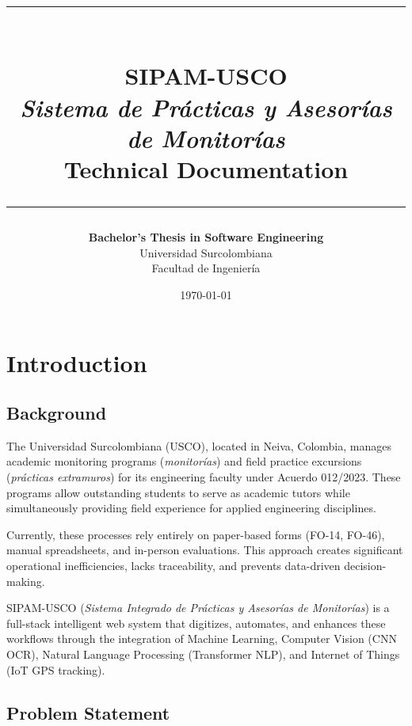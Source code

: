 \documentclass[12pt,a4paper]{report}
\title{
    \vspace{-1cm}
    \textcolor{uscoRed}{\rule{\textwidth}{2pt}}\\[0.5cm]
    \textbf{\Huge SIPAM-USCO}\\[0.3cm]
    \Large \textit{Sistema de Prácticas y Asesorías de Monitorías}\\[0.3cm]
    \LARGE Technical Documentation\\[0.5cm]
    \textcolor{uscoRed}{\rule{\textwidth}{2pt}}
}
\author{
    \textbf{Bachelor's Thesis in Software Engineering}\\[0.3cm]
    Universidad Surcolombiana\\
    Facultad de Ingeniería
}
\date{\today}
\begin{document}
\maketitle

\tableofcontents
\listoftables
\listoffigures

\chapter{Introduction}

\section{Background}

The Universidad Surcolombiana (USCO), located in Neiva, Colombia, manages academic monitoring programs (\textit{monitorías}) and field practice excursions (\textit{prácticas extramuros}) for its engineering faculty under Acuerdo 012/2023. These programs allow outstanding students to serve as academic tutors while simultaneously providing field experience for applied engineering disciplines.

Currently, these processes rely entirely on paper-based forms (FO-14, FO-46), manual spreadsheets, and in-person evaluations. This approach creates significant operational inefficiencies, lacks traceability, and prevents data-driven decision-making.

SIPAM-USCO (\textit{Sistema Integrado de Prácticas y Asesorías de Monitorías}) is a full-stack intelligent web system that digitizes, automates, and enhances these workflows through the integration of Machine Learning, Computer Vision (CNN OCR), Natural Language Processing (Transformer NLP), and Internet of Things (IoT GPS tracking).

\section{Problem Statement}
\end{document}
